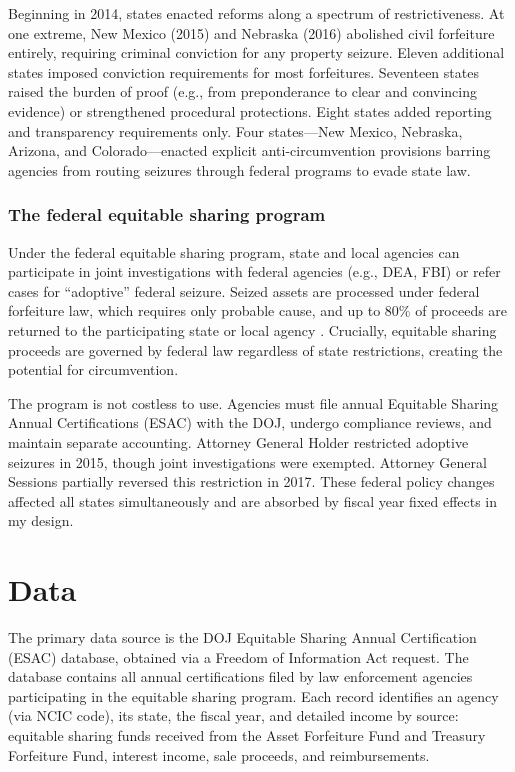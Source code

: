 \documentclass[12pt]{article}
\begin{document}
Beginning in 2014, states enacted reforms along a spectrum of restrictiveness. At one extreme, New Mexico (2015) and Nebraska (2016) abolished civil forfeiture entirely, requiring criminal conviction for any property seizure. Eleven additional states imposed conviction requirements for most forfeitures. Seventeen states raised the burden of proof (e.g., from preponderance to clear and convincing evidence) or strengthened procedural protections. Eight states added reporting and transparency requirements only. Four states---New Mexico, Nebraska, Arizona, and Colorado---enacted explicit anti-circumvention provisions barring agencies from routing seizures through federal programs to evade state law.

\subsubsection*{The federal equitable sharing program} Under the federal equitable sharing program, state and local agencies can participate in joint investigations with federal agencies (e.g., DEA, FBI) or refer cases for ``adoptive'' federal seizure. Seized assets are processed under federal forfeiture law, which requires only probable cause, and up to 80\% of proceeds are returned to the participating state or local agency \citep{doj2018equitable}. Crucially, equitable sharing proceeds are governed by federal law regardless of state restrictions, creating the potential for circumvention.

The program is not costless to use. Agencies must file annual Equitable Sharing Annual Certifications (ESAC) with the DOJ, undergo compliance reviews, and maintain separate accounting. Attorney General Holder restricted adoptive seizures in 2015, though joint investigations were exempted. Attorney General Sessions partially reversed this restriction in 2017. These federal policy changes affected all states simultaneously and are absorbed by fiscal year fixed effects in my design.


\section{Data}

The primary data source is the DOJ Equitable Sharing Annual Certification (ESAC) database, obtained via a Freedom of Information Act request. The database contains all annual certifications filed by law enforcement agencies participating in the equitable sharing program. Each record identifies an agency (via NCIC code), its state, the fiscal year, and detailed income by source: equitable sharing funds received from the Asset Forfeiture Fund and Treasury Forfeiture Fund, interest income, sale proceeds, and reimbursements.
\end{document}
